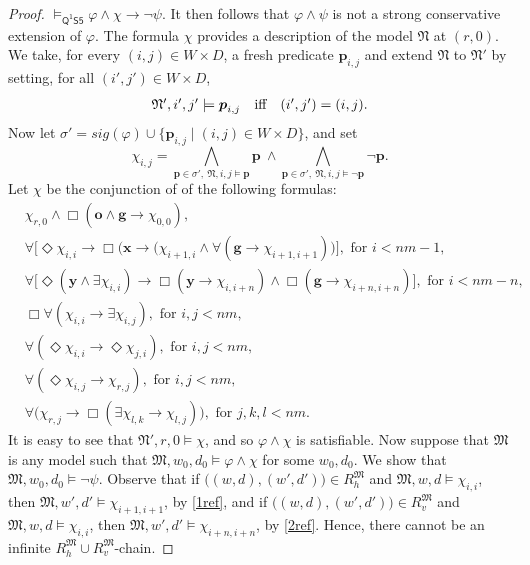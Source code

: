 \documentclass[10pt,a4paper]{amsart}
\theoremstyle{plain}
\theoremstyle{definition}
\newcommand{\sig}{\mathit{sig}}
\newcommand{\FOMS}{\ensuremath{\mathsf{Q^1S5}}}
\newcommand{\fform}[1]{\boldsymbol{#1}}
\newcommand{\pvar}{\fform{p}}
\newcommand{\gvar}{\fform{g}}
\newcommand{\xvar}{\fform{x}}
\newcommand{\yvar}{\fform{y}}
\newcommand{\ovar}{\fform{o}}
\newcommand{\Bv}{\forall}
\newcommand{\Bh}{\Box}
\newcommand{\Dv}{\exists}
\newcommand{\Dh}{\Diamond}
\begin{document}
\begin{proof}
		$\models_\FOMS\varphi\land\chi\to\neg\psi$.
		It then follows 
		that $\varphi \wedge \psi$ is not a strong conservative extension of $\varphi$. The formula $\chi$ provides a description of the model $\mathfrak{N}$ at $(r,0)$. We take, for every $(i,j)\in W\times D$, a fresh predicate $\pvar_{i,j}$ and extend $\mathfrak{N}$ to $\mathfrak{N}'$ by setting,
		for all $(i',j')\in W\times D$,	
		\begin{equation}
			\label{Mdesc2}
			\mbox{$\mathfrak N',i',j'\models \pvar_{i,j}$\quad iff\quad $(i',j')=(i,j)$.}
		\end{equation}
		Now let $\sigma'=\sig(\varphi) \cup \{\pvar_{i,j} \mid (i,j)\in W\times D\}$, and
		set
		\begin{equation}\label{Kdiagf}
			\chi_{i,j} = \bigwedge_{\pvar\in\sigma',\ \mathfrak N,i,j\models \pvar}\pvar\  \land
			\bigwedge_{\pvar\in\sigma',\ \mathfrak N,i,j\models \neg\pvar}\neg\pvar.
		\end{equation}
		Let $\chi$ be the conjunction of
		of the following formulas:
		\begin{align}
			\label{ref00}
			&\chi_{r,0}\land\Bh(\ovar\land\gvar\to\chi_{0,0}),\\
			\label{1ref}
			&\Bv \bigl[\Dh \chi_{i,i} \rightarrow \Bh \bigl(\xvar \rightarrow (\chi_{i+1,i} \wedge \Bv (\gvar \rightarrow \chi_{i+1,i+1})\bigr)\bigr],
			\text{ for $i<nm-1$}, \\
			\label{2ref}
			&\Bv \bigl[\Dh(\yvar\land\Dv \chi_{i,i}) \rightarrow \Bh(\yvar \rightarrow \chi_{i,i+n})\land\Bh(\gvar \rightarrow \chi_{i+n,i+n})\bigr], 
			\text{ for $i<nm-n$},\\
			\label{3refa}
			&\Bh\Bv (\chi_{i,i} \rightarrow \Dv \chi_{i,j}),\text{ for $i,j<nm$,}\\
			\label{3refb}
			&\Bv(\Dh\chi_{i,i} \rightarrow \Dh\chi_{j,i}),\text{ for $i,j<nm$,}\\		
			\label{3refc}
			&\Bv(\Dh\chi_{i,j} \rightarrow \chi_{r,j}),\text{ for $i,j<nm$},\\        
			\label{3ref}
			&\Bv \bigl(\chi_{r,j} \rightarrow \Bh( \Dv \chi_{l,k} \rightarrow \chi_{l,j})\bigr),\text{ for $j,k,l<nm$}.	
		\end{align}
		It is easy to see that
		$\mathfrak{N}',r,0\models \chi$, and so $\varphi \wedge \chi$ is satisfiable. 
		Now suppose that $\mathfrak{M}$ is any model such that $\mathfrak{M},w_0,d_0 \models \varphi\wedge\chi$ for some $w_0,d_0$. We show that $\mathfrak{M},w_0,d_0 \models\neg\psi$.
		Observe that if $\bigl((w,d),(w',d')\bigr)\in R_{h}^{\mathfrak{M}}$
		and $\mathfrak{M},w,d\models \chi_{i,i}$, then $\mathfrak{M},w',d'\models \chi_{i+1,i+1}$, by \eqref{1ref}, and if $\bigl((w,d),(w',d')\bigr)\in R_{v}^{\mathfrak{M}}$
		and $\mathfrak{M},w,d\models \chi_{i,i}$, then $\mathfrak{M},w',d'\models \chi_{i+n,i+n}$, by \eqref{2ref}. Hence, there cannot be an infinite $R_{h}^{\mathfrak{M}} \cup R_{v}^{\mathfrak{M}}$-chain. 
		

\end{proof}
\end{document}
